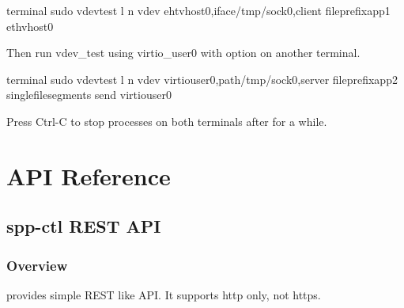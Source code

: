 \documentclass[a4paper,11pt,openany,oneside,english]{sphinxmanual}
\begin{document}
\begin{sphinxVerbatim}[commandchars=\\\{\},formatcom=\footnotesize]
 terminal 
 sudo vdev\PYGZus{}test \PYGZhy{}l  \PYGZhy{}n  \PYGZhy{}\PYGZhy{}vdev eht\PYGZus{}vhost0,iface/tmp/sock0,client 
  \PYGZhy{}\PYGZhy{}file\PYGZhy{}prefixapp1 \PYGZhy{}\PYGZhy{} eth\PYGZus{}vhost0
\end{sphinxVerbatim}

Then run vdev\_test using virtio\_user0 with  option on another
terminal.

\begin{sphinxVerbatim}[commandchars=\\\{\},formatcom=\footnotesize]
 terminal 
 sudo vdev\PYGZus{}test \PYGZhy{}l  \PYGZhy{}n  \PYGZhy{}\PYGZhy{}vdev virtio\PYGZus{}user0,path/tmp/sock0,server 
  \PYGZhy{}\PYGZhy{}file\PYGZhy{}prefixapp2 \PYGZhy{}\PYGZhy{}single\PYGZhy{}file\PYGZhy{}segments \PYGZhy{}\PYGZhy{} \PYGZhy{}\PYGZhy{}send virtio\PYGZus{}user0
\end{sphinxVerbatim}

Press Ctrl-C to stop processes on both terminals after for a while.


\chapter{API Reference}
\label{\detokenize{api_ref/index:api-reference}}\label{\detokenize{api_ref/index:spp-api-ref-index}}\label{\detokenize{api_ref/index::doc}}

\section{spp-ctl REST API}
\label{\detokenize{api_ref/overview:spp-ctl-rest-api}}\label{\detokenize{api_ref/overview:spp-ctl-rest-api-ref}}\label{\detokenize{api_ref/overview::doc}}

\subsection{Overview}
\label{\detokenize{api_ref/overview:overview}}
 provides simple REST like API. It supports http only, not https.
\end{document}
